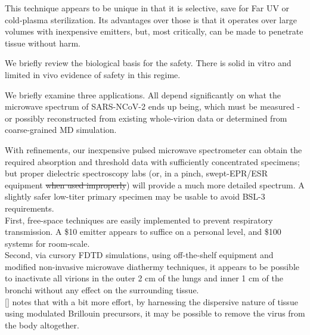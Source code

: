 \documentclass[paper.tex]{subfiles}
\begin{document}
This technique appears to be unique in that it is selective, save for Far UV or cold-plasma sterilization. Its advantages over those is that it operates over large volumes with inexpensive emitters, but, most critically, can be made to penetrate tissue without harm.

We briefly review the biological basis for the safety. There is solid in vitro and limited in vivo evidence of safety in this regime.


We briefly examine three applications. All depend significantly on what the microwave spectrum of SARS-NCoV-2 ends up being, which must be measured - or possibly reconstructed from existing whole-virion data or determined from coarse-grained MD simulation. 

With refinements, our inexpensive pulsed microwave spectrometer can obtain the required absorption and threshold data with sufficiently concentrated specimens; but proper dielectric spectroscopy labs (or, in a pinch, swept-EPR/ESR equipment \st{when used improperly}) will provide a much more detailed spectrum. A slightly safer low-titer primary specimen may be usable to avoid BSL-3 requirements. \\



First, free-space techniques are easily implemented to prevent respiratory transmission. A \$10 emitter appears to suffice on a personal level, and \$100 systems for room-scale.\\
 
%
Second, via cursory FDTD simulations, using off-the-shelf equipment and modified non-invasive microwave diathermy techniques, it appears to be possible to inactivate all virions in the outer 2 cm of the lungs and inner 1 cm of the bronchi without any effect on the surrounding tissue. 
\\

[] notes that with a bit more effort, by harnessing the dispersive nature of tissue using modulated Brillouin precursors, it may be possible to remove the virus from the body altogether.\\
\end{document}
